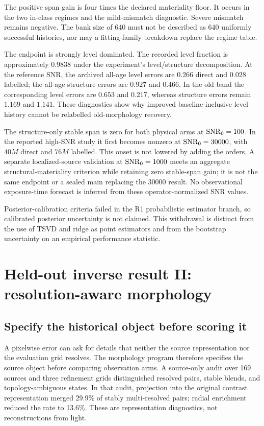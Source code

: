The positive span gain is four times the declared materiality floor. It occurs in the two in-class regimes and the mild-mismatch diagnostic. Severe mismatch remains negative. The bank size of 640 must not be described as 640 uniformly successful histories, nor may a fitting-family breakdown replace the regime table.

The endpoint is strongly level dominated. The recorded level fraction is approximately $0.9838$ under the experiment's level/structure decomposition. At the reference SNR, the archived all-age level errors are $0.266$ direct and $0.028$ labelled; the all-age structure errors are $0.927$ and $0.466$. In the old band the corresponding level errors are $0.653$ and $0.217$, whereas structure errors remain $1.169$ and $1.141$. These diagnostics show why improved baseline-inclusive level history cannot be relabelled old-morphology recovery.

The structure-only stable span is zero for both physical arms at $\mathrm{SNR}_0=100$. In the reported high-SNR study it first becomes nonzero at $\mathrm{SNR}_0=30000$, with $40M$ direct and $76M$ labelled. This onset is not lowered by adding the orders. A separate localized-source validation at $\mathrm{SNR}_0=1000$ meets an aggregate structural-materiality criterion while retaining zero stable-span gain; it is not the same endpoint or a sealed main replacing the $30000$ result. No observational exposure-time forecast is inferred from these operator-normalized SNR values.

Posterior-calibration criteria failed in the R1 probabilistic estimator branch, so calibrated posterior uncertainty is not claimed. This withdrawal is distinct from the use of TSVD and ridge as point estimators and from the bootstrap uncertainty on an empirical performance statistic.

\section{Held-out inverse result II: resolution-aware morphology}\label{sec:morphology}
\subsection{Specify the historical object before scoring it}
A pixelwise error can ask for details that neither the source representation nor the evaluation grid resolves. The morphology program therefore specifies the source object before comparing observation arms. A source-only audit over 169 sources and three refinement grids distinguished resolved pairs, stable blends, and topology-ambiguous states. In that audit, projection into the original contrast representation merged 29.9\% of stably multi-resolved pairs; radial enrichment reduced the rate to 13.6\%. These are representation diagnostics, not reconstructions from light.

